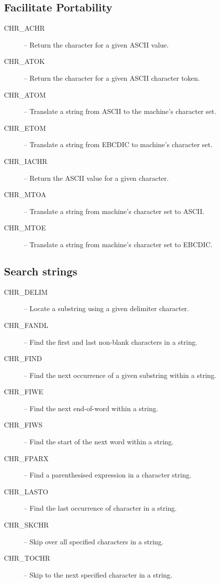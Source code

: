 \documentclass[twoside,11pt,nolof]{starlink}
\begin{document}
\subsection{Facilitate Portability}

\begin{description}
\item [CHR\_ACHR] -- Return the character for a given ASCII value.
\item [CHR\_ATOK] -- Return the character for a given ASCII character token.
\item [CHR\_ATOM] -- Translate a string from ASCII to the machine's character
set.
\item [CHR\_ETOM] -- Translate a string from EBCDIC to machine's character set.
\item [CHR\_IACHR] -- Return the ASCII value for a given character.
\item [CHR\_MTOA] -- Translate a string from machine's character set to ASCII.
\item [CHR\_MTOE] -- Translate a string from machine's character set to EBCDIC.
\end{description}


\subsection{Search strings}

\begin {description}
\item [CHR\_DELIM] -- Locate a substring using a given delimiter character.
\item [CHR\_FANDL] -- Find the first and last non-blank characters in a string.
\item [CHR\_FIND] -- Find the next occurrence of a given substring within a string.
\item [CHR\_FIWE] -- Find the next end-of-word within a string.
\item [CHR\_FIWS] -- Find the start of the next word within a string.
\item [CHR\_FPARX] -- Find a parenthesised expression in a character string.
\item [CHR\_LASTO] -- Find the last occurrence of character in a string.
\item [CHR\_SKCHR] -- Skip over all specified characters in a string.
\item [CHR\_TOCHR] -- Skip to the next specified character in a string.
\end {description}
\end{document}
